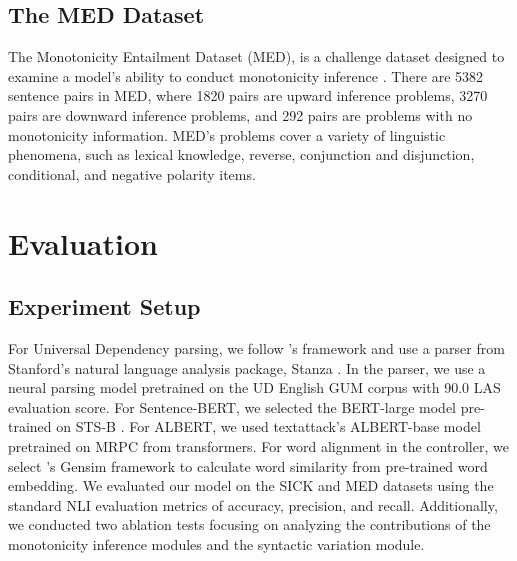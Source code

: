 \documentclass[11pt,a4paper]{article}
\begin{document}
\subsection{The MED Dataset}
The Monotonicity Entailment Dataset (MED), is a challenge dataset designed to examine a model's ability to conduct monotonicity inference \citep{yanaka-etal-2019-neural}. There are 5382 sentence pairs in MED, where 1820 pairs are upward inference problems, 3270 pairs are downward inference problems, and 292 pairs are problems
with no monotonicity information. MED's problems cover a variety of linguistic phenomena, such as lexical knowledge, reverse, conjunction and disjunction, conditional, and negative polarity items.


\section{Evaluation}
\subsection{Experiment Setup}
For Universal Dependency parsing, we follow \citet{chengaoudep2mono}'s framework and use a parser from Stanford's natural language analysis package, Stanza \cite{qi-etal-2020-stanza}. In the parser, we use a neural parsing model pretrained on the UD English GUM corpus \cite{Zeldes2017} with 90.0 LAS \cite{zeman-etal-2018-conll} evaluation score. For Sentence-BERT, we selected the BERT-large model pre-trained on STS-B \cite{cer-etal-2017-semeval}. For ALBERT, we used textattack's ALBERT-base model pretrained on MRPC from transformers. For word alignment in the controller, we select \citet{rehurek_lrec}'s Gensim framework to calculate word similarity from pre-trained word embedding. 
We evaluated our model on the SICK and MED datasets using the standard NLI evaluation metrics of accuracy, precision, and recall. Additionally, we conducted two ablation tests focusing on analyzing the contributions of the monotonicity inference modules and the syntactic variation module. 
\end{document}
